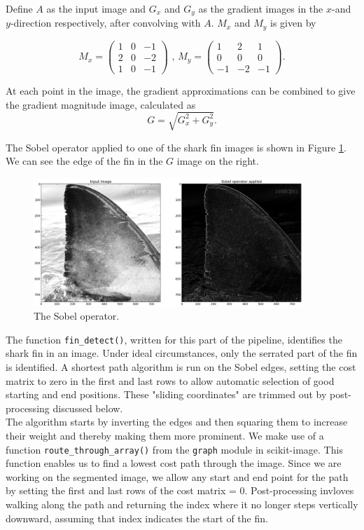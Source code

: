 \documentclass[a4paper,10pt]{article}
\begin{document}
Define $A$ as the input image and $G_x$ and $G_y$ as the gradient images in the
$x$-and $y$-direction respectively,
after convolving with $A$.  $M_x$ and $M_y$ is given by

\[
 M_x = \begin{pmatrix*}
        1 & 0 & -1 \\
        2 & 0 & -2 \\
        1 & 0 & -1
       \end{pmatrix*}
\mbox{ , }
 M_y = \begin{pmatrix*}
        1 & 2 & 1 \\
        0 & 0 & 0 \\
        -1 & -2 & -1
       \end{pmatrix*}
.\]

At each point in the image, the gradient approximations can be combined to give
the gradient magnitude image, calculated  as
\[
 G = \sqrt{G_x^2+G_y^2}
.\]

The Sobel operator applied to one of the shark fin images is shown in Figure 
\ref{sobel}.
We can see the edge of the fin in the $G$ image on the right.

\begin{figure}[H]
 \centering
 \includegraphics[width=4in]{sobel.jpg}
 \caption{The Sobel operator.}
 \label{sobel}
\end{figure}

The function \texttt{fin\_detect()}, written for this part of the pipeline, identifies the shark fin in an image.
Under ideal circumstances, only the serrated part of the fin is
identified.  A shortest path algorithm is run on the Sobel edges, setting
the cost matrix to zero in the first and last rows to allow automatic
selection of good starting and end positions.  These "sliding coordinates"
are trimmed out by post-processing discussed below. \\

The algorithm starts by inverting the edges and then squaring
them to increase their weight and thereby making them more prominent.  We make use of a function 
\texttt{route\_through\_array()}\cite{scikit} from the \texttt{graph} module in scikit-image.
 This function enables us to find a lowest cost path through the
 image.
Since we are working on the segmented image, we allow any start and end point
for the path by setting the first and last rows of the
  cost matrix = 0.
 Post-processing invloves walking 
along the path and returning the index where it no longer steps
vertically downward, assuming that index indicates the start of the fin.
\end{document}
